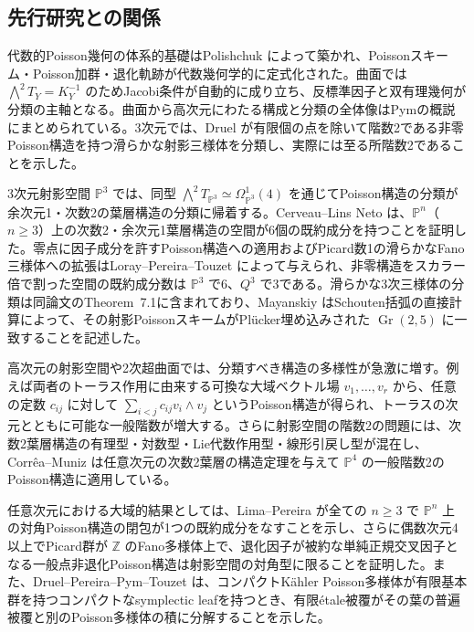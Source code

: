 \subsection*{先行研究との関係}
代数的Poisson幾何の体系的基礎はPolishchuk \cite{PPolishchuk} によって築かれ、Poissonスキーム・Poisson加群・退化軌跡が代数幾何学的に定式化された。曲面では $\bigwedge^2T_Y=K_Y^{-1}$ のためJacobi条件が自動的に成り立ち、反標準因子と双有理幾何が分類の主軸となる。曲面から高次元にわたる構成と分類の全体像はPymの概説 \cite[\S\S2--5]{PPymSurvey} にまとめられている。3次元では、Druel \cite[p.~230]{DruelThreefold} が有限個の点を除いて階数2である非零Poisson構造を持つ滑らかな射影三様体を分類し、実際には至る所階数2であることを示した。

3次元射影空間 $\mathbb P^3$ では、同型 $\bigwedge^2T_{\mathbb P^3}\simeq\Omega^1_{\mathbb P^3}(4)$ を通じてPoisson構造の分類が余次元1・次数2の葉層構造の分類に帰着する。Cerveau--Lins Neto \cite{CerveauLinsNeto} は、$\mathbb P^n$（$n\ge3$）上の次数2・余次元1葉層構造の空間が6個の既約成分を持つことを証明した。零点に因子成分を許すPoisson構造への適用およびPicard数1の滑らかなFano三様体への拡張はLoray--Pereira--Touzet \cite[\S9, Theorem~9.1]{LPTPoissonCubic} によって与えられ、非零構造をスカラー倍で割った空間の既約成分数は $\mathbb P^3$ で6、$Q^3$ で3である。滑らかな3次三様体の分類は同論文のTheorem~7.1に含まれており、Mayanskiy \cite[Theorem~1]{PMayanskiy} はSchouten括弧の直接計算によって、その射影PoissonスキームがPl\"ucker埋め込みされた $\operatorname{Gr}(2,5)$ に一致することを記述した。

高次元の射影空間や2次超曲面では、分類すべき構造の多様性が急激に増す。例えば両者のトーラス作用に由来する可換な大域ベクトル場 $v_1,\ldots,v_r$ から、任意の定数 $c_{ij}$ に対して $\sum_{i<j}c_{ij}v_i\wedge v_j$ というPoisson構造が得られ、トーラスの次元とともに可能な一般階数が増大する。さらに射影空間の階数2の問題には、次数2葉層構造の有理型・対数型・Lie代数作用型・線形引戻し型が混在し、Corr\^ea--Muniz \cite[Theorem~A, Corollary~C]{CorreaMuniz} は任意次元の次数2葉層の構造定理を与えて $\mathbb P^4$ の一般階数2のPoisson構造に適用している。

任意次元における大域的結果としては、Lima--Pereira \cite[Theorems~1--2]{LimaPereiraDiagonal} が全ての $n\ge3$ で $\mathbb P^n$ 上の対角Poisson構造の閉包が1つの既約成分をなすことを示し、さらに偶数次元4以上でPicard群が $\mathbb Z$ のFano多様体上で、退化因子が被約な単純正規交叉因子となる一般点非退化Poisson構造は射影空間の対角型に限ることを証明した。また、Druel--Pereira--Pym--Touzet \cite[Theorem~1.1]{GlobalWeinstein} は、コンパクトK\"ahler Poisson多様体が有限基本群を持つコンパクトなsymplectic leafを持つとき、有限\'etale被覆がその葉の普遍被覆と別のPoisson多様体の積に分解することを示した。

